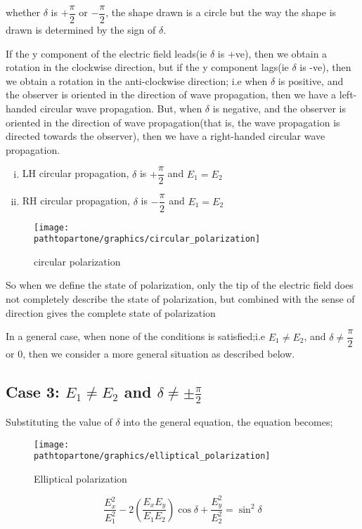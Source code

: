 whether  $\delta$ is $+\dfrac{\pi}{2}$  or  $-\dfrac{\pi}{2} $, the shape drawn is a circle but the way the shape is drawn is determined by the sign of $\delta$.

If the y component of the electric field leads(ie $\delta$ is +ve), then we obtain a rotation in the clockwise direction, but if the y component lags(ie $\delta$ is -ve), then we obtain a rotation in the anti-clockwise direction; i.e when $\delta$ is positive, and the observer is oriented in the direction of wave propagation, then we have a left-handed circular wave propagation. But, when $\delta$ is negative, and the observer is oriented in the direction of wave propagation(that is, the wave propagation is directed towards the observer), then we have a right-handed circular wave propagation.
\begin{enumerate}[(i)]
\item LH circular propagation, $\delta$ is $ +\dfrac{\pi}{2}$ and $ E_1 = E_2$
\item RH circular propagation, $\delta$ is $-\dfrac{\pi}{2}$ and $ E_1 = E_2$ 
\end{enumerate}
\begin{figure}[h]
\centering
\texttt{[image: \\pathtopartone/graphics/circular\_polarization]}
\caption{circular polarization}
\end{figure} 

So when we define the state of polarization, only the tip of the electric field does not completely describe the state of polarization, but combined with the sense of direction gives the complete state of polarization

In a general case, when none of the conditions is satisfied;i.e $ E_1 \neq E_2$, and $\delta\neq\dfrac{\pi}{2}$ or $ 0 $, then we consider a more general situation as described below.

\subsection{Case 3: \texorpdfstring{$E_1\neq E_2$}{E1≠E2} and \texorpdfstring{$\delta\neq\pm\frac{\pi}{2}$}{δ≠𝜆/2}}
Substituting the value of $\delta$ into the general equation, the equation becomes;
\begin{figure}[h]
\centering
\texttt{[image: \\pathtopartone/graphics/elliptical\_polarization]}
\caption{Elliptical polarization}
\end{figure}

\begin{equation}
\frac{E_{x}^2}{E_{1}^2} -2(\frac{E_{x}E_{y}}{E_{1}E_{2}})\cos\delta + \frac{E_{y}^2}{E_{2}^2} =\sin^2 \delta
\end{equation}

